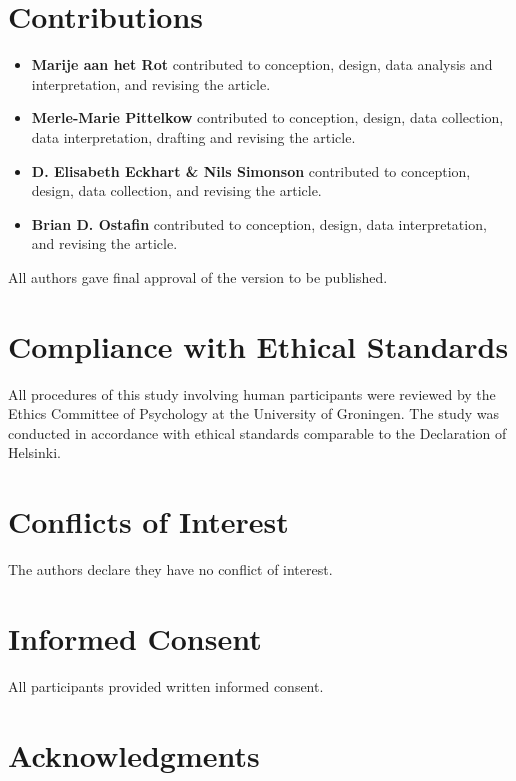 \documentclass[authordate, empirical, issue]{jote-new-article}
\begin{document}
\section{Contributions}
\begin{itemize}
  \item \textbf{Marije aan het Rot} contributed to conception, design, data analysis and interpretation, and revising the article.
  \item \textbf{Merle-Marie Pittelkow} contributed to conception, design, data collection, data interpretation, drafting and revising the article.
  \item \textbf{D. Elisabeth Eckhart \& Nils Simonson} contributed to conception, design, data collection, and revising the article.
  \item \textbf{Brian D. Ostafin} contributed to conception, design, data interpretation, and revising the article.
\end{itemize}
All authors gave final approval of the version to be published.


\section{Compliance with Ethical Standards}



All procedures of this study involving human participants were reviewed by the Ethics Committee of Psychology at the University of Groningen.\emph{\textbf{ }}The study was conducted in accordance with ethical standards comparable to the Declaration of Helsinki.



\section{Conflicts of Interest}

The authors declare they have no conflict of interest.

\section{Informed Consent}
All participants provided written informed consent.

\newpage


\section{Acknowledgments}
\end{document}
